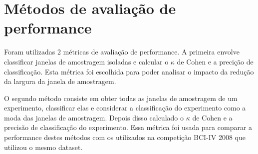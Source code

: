 \section{M\'etodos de avalia\c{c}\~ao de performance}
\par 
Foram utilizadas 2 m\'etricas de avalia\c{c}\~ao de performance.
A primeira envolve classificar janelas de amostragem isoladas e calcular o $\kappa$ de Cohen e a preci\c{c}\~ao de classifica\c{c}\~ao.
 Esta m\'etrica foi escolhida para poder analisar o impacto da redu\c{c}\~ao da largura da janela de amostragem.
\par
O segundo m\'etodo consiste em obter todas as janelas de amostragem de um experimento, classificar elas e considerar a classifica\c{c}\~ao do experimento como a moda das janelas de amostragem. Depois disso calculado o $\kappa$ de Cohen e a precis\~ao de classifica\c{c}\~ao do experimento.
 Essa m\'etrica foi usada para comparar a performance destes m\'etodos com os utilizados na competi\c{c}\~ao \ac{BCI}-IV 2008 que utilizou o mesmo dataset.